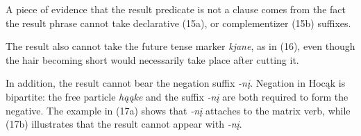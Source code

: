 \documentclass[output=paper]{LSP/langsci}
\begin{document}
A piece of evidence that the result predicate is not a clause comes from the fact the result phrase cannot take declarative (15a), or complementizer (15b) suffixes.

\begin{exe}
\ex
\begin{xlist}



\end{xlist}
\end{exe}

The result also cannot take the future tense marker \textit{kjane}, as in (16), even though the hair becoming short would necessarily take place after cutting it.

\begin{exe}


\end{exe}

In addition, the result cannot bear the negation suffix \textit{-nį}. Negation in Hocąk is bipartite: the free particle \textit{hąąke} and the suffix \textit{-nį} are both required to form the negative. The example in (17a) shows that \textit{-nį} attaches to the matrix verb, while (17b) illustrates that the result cannot appear with \textit{-nį}.
\end{document}
